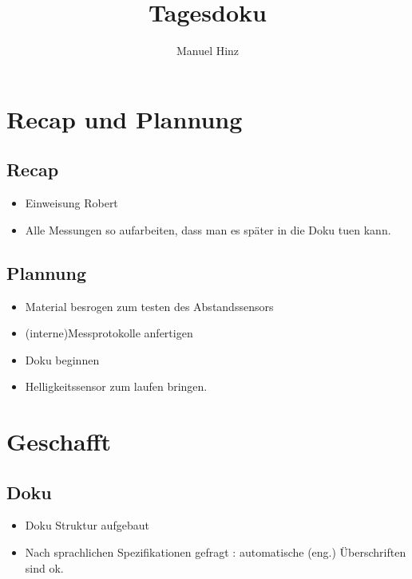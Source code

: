 \documentclass{article}
\author{Manuel Hinz}
\title{Tagesdoku}
\begin{document}
\maketitle

\section{Recap und Plannung}

\subsection{Recap}

\begin{itemize}

\item Einweisung Robert

\item Alle Messungen so aufarbeiten, dass man es sp\"{a}ter in die Doku tuen kann.

\end{itemize}

\subsection{Plannung}

\begin{itemize}

\item Material besrogen zum testen des Abstandssensors

\item (interne)Messprotokolle anfertigen

\item Doku beginnen

\item Helligkeitssensor zum laufen bringen.

\end{itemize}

\section{Geschafft}

\subsection{Doku}

\begin{itemize}

\item Doku Struktur aufgebaut

\item Nach sprachlichen Spezifikationen gefragt : automatische (eng.) \"{U}berschriften sind ok. 

\end{itemize}
\end{document}
